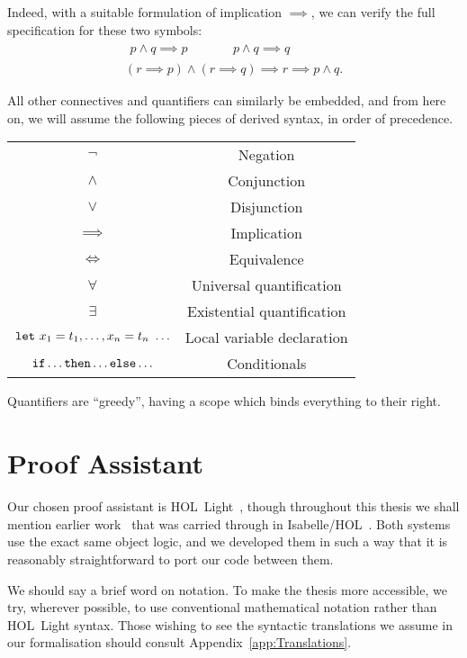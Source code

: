 Indeed, with a suitable formulation of implication $\implies$, we can verify the full specification for these two symbols:
\begin{gather}
  \begin{aligned}
    p \wedge q \implies p &\qquad& p \wedge q \implies q
  \end{aligned}\\
    (r \implies p) \wedge (r \implies q) \implies r \implies p \wedge q.
\end{gather}

All other connectives and quantifiers can similarly be embedded, and from here on, we will assume the following pieces of derived syntax, in order of precedence. 

\begin{center}
\begin{tabular}{|c|c|}
\hline
$\neg$   & Negation\\
$\wedge$ & Conjunction\\
$\vee$   & Disjunction\\
$\implies$ & Implication\\
$\iff$   & Equivalence\\
$\forall$ & Universal quantification\\
$\exists$ & Existential quantification\\
$\code{let}\ x_1=t_1,\ldots, x_n=t_n\ \ldots$ & Local variable declaration\\
$\texttt{if}\ldots\texttt{then}\ldots\texttt{else}\ldots$ & Conditionals\\
\hline
\end{tabular}
\end{center}

Quantifiers are ``greedy'', having a scope which binds everything to their right.

\section{Proof Assistant}\label{sec:LCF}
Our chosen proof assistant is HOL~Light~\cite{HOLLight}, though throughout this thesis we shall mention earlier work~\cite{ScottMScThesis} that was carried through in Isabelle/HOL~\cite{Isabelle}. Both systems use the exact same object logic, and we developed them in such a way that it is reasonably straightforward to port our code between them.

We should say a brief word on notation. To make the thesis more accessible, we try, wherever possible, to use conventional mathematical notation rather than HOL~Light syntax. Those wishing to see the syntactic translations we assume in our formalisation should consult Appendix~\ref{app:Translations}.


